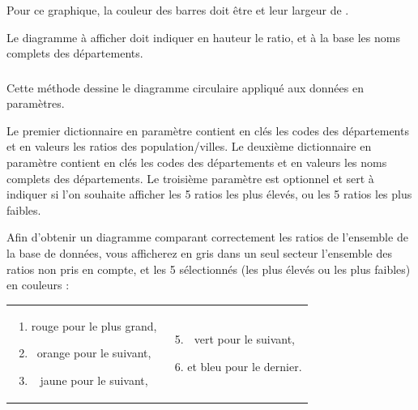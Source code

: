 \noindent Pour ce graphique, la couleur des barres doit être  et leur largeur de .

\noindent Le diagramme à afficher doit indiquer en hauteur le ratio, et à la base les noms complets des départements.


\bigskip


\subsubsection*{}

\noindent Cette méthode dessine le diagramme circulaire appliqué aux données en paramètres.

\noindent Le premier dictionnaire en paramètre contient en clés les codes des départements et en valeurs les ratios des population/villes.
Le deuxième dictionnaire en paramètre contient en clés les codes des départements et en valeurs les noms complets des départements.
Le troisième paramètre est optionnel et sert à indiquer si l'on souhaite afficher les 5 ratios les plus élevés, ou les 5 ratios les plus faibles.

\noindent Afin d'obtenir un diagramme comparant correctement les ratios de l'ensemble de la base de données, vous afficherez en gris dans un seul secteur l'ensemble des ratios non pris en compte, et les 5 sélectionnés (les plus élevés ou les plus faibles) en couleurs :

\begin{table}[ht!]
  \centering
\begin{tabular}{c c}
  \begin{minipage}{0.45\textwidth}

\begin{enumerate}
\item rouge pour le plus grand,
\item orange pour le suivant,
\item jaune pour le suivant,
\end{enumerate}

  \end{minipage}
&
  \begin{minipage}{0.45\textwidth}

\begin{enumerate}
\setcounter{enumi}{4}
\item vert pour le suivant,
\item et bleu pour le dernier.
\end{enumerate}

\phantom{Test.}

  \end{minipage}
\end{tabular}
\end{table}


